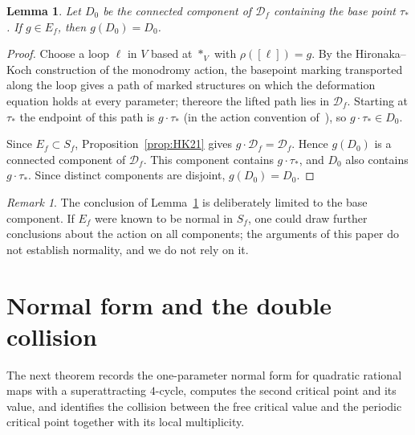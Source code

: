 \documentclass[12pt]{article}
\newtheorem{lemma}[theorem]{Lemma}
\theoremstyle{definition}
\theoremstyle{remark}
\newtheorem{remark}[theorem]{Remark}
\numberwithin{equation}{section}
\newcommand{\Df}{\mathcal D_f}
\newcommand{\Sf}{S_f}
\newcommand{\Ef}{E_f}
\begin{document}
\begin{lemma}
\label{lem:base-component}
Let $D_{0}$ be the connected component of $\Df$ containing the base
point $\tau_{*}$.  If $g\in\Ef$, then $g(D_{0})=D_{0}$.
\end{lemma}
\begin{proof}
Choose a loop $\ell$ in $V$ based at $*_{V}$ with $\rho([\ell])=g$.
By the Hironaka--Koch construction of the monodromy action, the
basepoint marking transported along the loop gives a path of marked
structures on which the deformation equation holds at every parameter;
thereore the lifted path lies in $\Df$.  Starting at $\tau_{*}$ the
endpoint of this path is $g\cdot\tau_{*}$ (in the action convention
of~\cite{HK}), so $g\cdot\tau_{*}\in D_{0}$.

Since $\Ef\subset\Sf$, Proposition~\ref{prop:HK21} gives
$g\cdot\Df=\Df$.  Hence $g(D_{0})$ is a connected component of $\Df$.
This component contains $g\cdot\tau_{*}$, and $D_{0}$ also contains
$g\cdot\tau_{*}$.  Since distinct components are disjoint,
$g(D_{0})=D_{0}$.
\end{proof}

\begin{remark}
The conclusion of Lemma~\ref{lem:base-component} is deliberately
limited to the base component.  If $\Ef$ were known to be normal in
$\Sf$, one could draw further conclusions about the action on all
components; the arguments of this paper do not establish normality, and
we do not rely on it.
\end{remark}

\section{Normal form and the double collision}
\label{sec:normal-form}

The next theorem records the one-parameter normal form for quadratic
rational maps with a superattracting $4$-cycle, computes the second
critical point and its value, and identifies the collision between the
free critical value and the periodic critical point together with its
local multiplicity.
\end{document}
